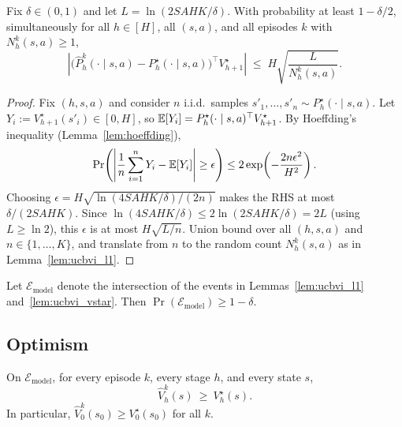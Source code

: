 \begin{lemma}
\label{lem:ucbvi_vstar}
Fix $\delta\in(0,1)$ and let $L=\ln(2SAHK/\delta)$.
With probability at least $1-\delta/2$, simultaneously for all $h\in[H]$, all $(s,a)$,
and all episodes $k$ with $N_h^k(s,a)\ge 1$,
\[
\left|\big(\widehat P_h^k(\cdot\mid s,a)-P_h^\star(\cdot\mid s,a)\big)^\top V_{h+1}^\star\right|
\;\le\;
H\sqrt{\frac{L}{N_h^k(s,a)}}.
\]
\end{lemma}

\begin{proof}
Fix $(h,s,a)$ and consider $n$ i.i.d.\ samples $s'_1,\dots,s'_n\sim P_h^\star(\cdot\mid s,a)$.
Let $Y_i := V_{h+1}^\star(s'_i)\in[0,H]$, so $\mathbb{E}[Y_i]=P_h^\star(\cdot\mid s,a)^\top V_{h+1}^\star$.
By Hoeffding's inequality (Lemma~\ref{lem:hoeffding}),
\[
\Pr\!\left(\left|\frac{1}{n}\sum_{i=1}^n Y_i - \mathbb{E}[Y_i]\right|\ge \epsilon\right)
\le 2\exp\!\left(-\frac{2n\epsilon^2}{H^2}\right).
\]
Choosing $\epsilon = H\sqrt{\ln(4SAHK/\delta)/(2n)}$ makes the RHS at most $\delta/(2SAHK)$.
Since $\ln(4SAHK/\delta)\le 2\ln(2SAHK/\delta)=2L$ (using $L\ge \ln 2$), this $\epsilon$
is at most $H\sqrt{L/n}$.
Union bound over all $(h,s,a)$ and $n\in\{1,\dots,K\}$, and translate from $n$ to the
random count $N_h^k(s,a)$ as in Lemma~\ref{lem:ucbvi_l1}.
\end{proof}

Let $\mathcal{E}_{\mathrm{model}}$ denote the intersection of the events in
Lemmas~\ref{lem:ucbvi_l1} and~\ref{lem:ucbvi_vstar}.
Then $\Pr(\mathcal{E}_{\mathrm{model}})\ge 1-\delta$.

\subsection{Optimism}

\begin{lemma}[Optimism]
\label{lem:ucbvi_optimism}
On $\mathcal{E}_{\mathrm{model}}$, for every episode $k$, every stage $h$, and every state $s$,
\[
\widehat V_h^k(s)\ \ge\ V_h^\star(s).
\]
In particular, $\widehat V_0^k(s_0)\ge V_0^\star(s_0)$ for all $k$.
\end{lemma}

